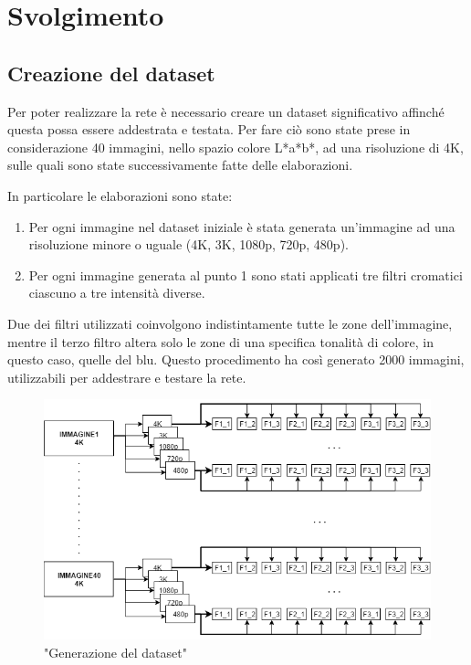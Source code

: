 \documentclass[a4paper,11pt]{article}
\begin{document}
  
    \newpage

    \section{Svolgimento}

    \subsection{Creazione del dataset}
    Per poter realizzare la rete è necessario creare un dataset significativo affinché questa possa essere addestrata e testata. 
    Per fare ciò sono state prese in considerazione 40 immagini, nello spazio colore L*a*b*, ad una risoluzione di 4K, sulle quali sono state successivamente fatte delle elaborazioni.

    In particolare le elaborazioni sono state:
    \begin{enumerate}
        \item Per ogni immagine nel dataset iniziale è stata generata un'immagine ad una risoluzione minore o uguale (4K, 3K, 1080p, 720p, 480p).
        \item Per ogni immagine generata al punto 1 sono stati applicati tre filtri cromatici ciascuno a tre intensità diverse.
    \end{enumerate}
    Due dei filtri utilizzati coinvolgono indistintamente tutte le zone dell'immagine, mentre il terzo filtro altera solo le zone di una specifica tonalità di colore, in questo caso, quelle del blu.
    Questo procedimento ha così generato 2000 immagini, utilizzabili per addestrare e testare la rete.
    
    \begin{figure}[h]
        \centering
        \includegraphics[scale=0.55]{generazione.png}
        \caption{"Generazione del dataset"}
    \end{figure}
    \newpage
\end{document}
